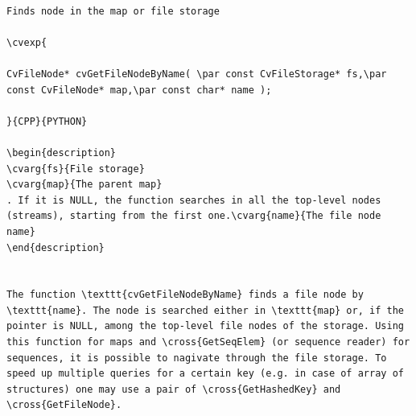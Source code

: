 \begin{verbatim}

Finds node in the map or file storage

\cvexp{

CvFileNode* cvGetFileNodeByName( \par const CvFileStorage* fs,\par const CvFileNode* map,\par const char* name );

}{CPP}{PYTHON}

\begin{description}
\cvarg{fs}{File storage}
\cvarg{map}{The parent map}
. If it is NULL, the function searches in all the top-level nodes (streams), starting from the first one.\cvarg{name}{The file node name}
\end{description}


The function \texttt{cvGetFileNodeByName} finds a file node by \texttt{name}. The node is searched either in \texttt{map} or, if the pointer is NULL, among the top-level file nodes of the storage. Using this function for maps and \cross{GetSeqElem} (or sequence reader) for sequences, it is possible to nagivate through the file storage. To speed up multiple queries for a certain key (e.g. in case of array of structures) one may use a pair of \cross{GetHashedKey} and \cross{GetFileNode}.


\end{verbatim}
\label{GetHashedKey}
